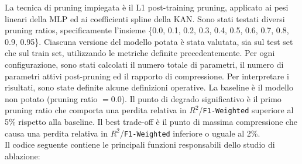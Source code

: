 \documentclass[a4paper,12pt]{report}
\begin{document}
	La tecnica di pruning impiegata è il L1 post-training pruning, applicato ai pesi lineari della MLP ed ai coefficienti spline della KAN. Sono stati testati diversi pruning ratios, specificamente l'insieme \{0.0, 0.1, 0.2, 0.3, 0.4, 0.5, 0.6, 0.7, 0.8, 0.9, 0.95\}. Ciascuna versione del modello potata è stata valutata, sia sul test set che sul train set, utilizzando le metriche definite precedentemente. Per ogni configurazione, sono stati calcolati il numero totale di parametri, il numero di parametri attivi post-pruning ed il rapporto di compressione. Per interpretare i risultati, sono state definite alcune definizioni operative. La baseline è il modello non potato (pruning ratio $= 0.0$). Il punto di degrado significativo è il primo pruning ratio che comporta una perdita relativa in $R^2$/\texttt{F1-Weighted} superiore al 5\% rispetto alla baseline. Il best trade-off è il punto di massima compressione che causa una perdita relativa in $R^2$/\texttt{F1-Weighted} inferiore o uguale al 2\%. \\
	Il codice seguente contiene le principali funzioni responsabili dello studio di ablazione:
\end{document}
